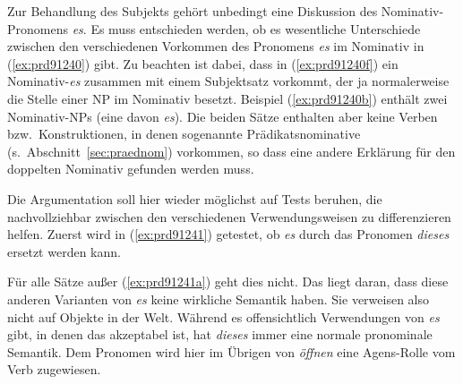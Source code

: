 \label{sec:expletiva}

Zur Behandlung des Subjekts gehört unbedingt eine Diskussion des Nominativ-Pronomens \textit{es}.
Es muss entschieden werden, ob es wesentliche Unterschiede zwischen den verschiedenen Vorkommen des Pronomens \textit{es} im Nominativ in (\ref{ex:prd91240}) gibt.
Zu beachten ist dabei, dass in (\ref{ex:prd91240f}) ein Nominativ-\textit{es} zusammen mit einem Subjektsatz vorkommt, der ja normalerweise die Stelle einer NP im Nominativ besetzt.
Beispiel (\ref{ex:prd91240b}) enthält zwei Nominativ-NPs (eine davon \textit{es}). 
Die beiden Sätze enthalten aber keine Verben bzw.\ Konstruktionen, in denen sogenannte Prädikatsnominative (s.\ Abschnitt~\ref{sec:praednom}) vorkommen, so dass eine andere Erklärung für den doppelten Nominativ gefunden werden muss.

\begin{exe}
  \ex\label{ex:prd91240}
  \begin{xlist}
  \end{xlist}
\end{exe}

Die Argumentation soll hier wieder möglichst auf Tests beruhen, die nachvollziehbar zwischen den verschiedenen Verwendungsweisen zu differenzieren helfen.
Zuerst wird in (\ref{ex:prd91241}) getestet, ob \textit{es} durch das Pronomen \textit{dieses} ersetzt werden kann.

\begin{exe}
  \ex\label{ex:prd91241}
  \begin{xlist}
  \end{xlist}
\end{exe}

Für alle Sätze außer (\ref{ex:prd91241a}) geht dies nicht.
Das liegt daran, dass diese anderen Varianten von \textit{es} keine wirkliche Semantik haben.
Sie verweisen also nicht auf Objekte in der Welt.
Während es offensichtlich Verwendungen von \textit{es} gibt, in denen das akzeptabel ist, hat \textit{dieses} immer eine normale pronominale Semantik.
Dem Pronomen wird hier im Übrigen von \textit{öffnen} eine Agens-Rolle vom Verb zugewiesen.


